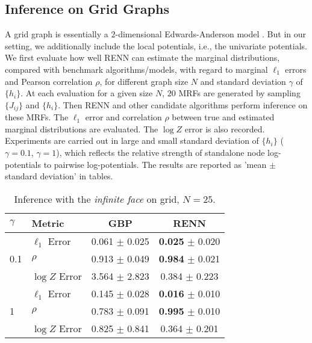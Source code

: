 \subsection{Inference on Grid Graphs}

A grid graph is essentially a $2$-dimensional Edwards-Anderson model \cite{Edwards_1975}. But in our setting, we additionally include the local potentials, i.e., the univariate potentials. We first evaluate how well RENN can estimate the marginal distributions, compared with benchmark algorithms/models, with regard to marginal $\ell_1$ errors and Pearson correlation $\rho$, for different graph size $N$ and standard deviation $\gamma$ of $\{h_i\}$. At each evaluation for a given size $N$, $20$ MRFs are generated by sampling $\{J_{ij}\}$ and $\{h_i\}$. Then RENN and other candidate algorithms perform inference on these MRFs. The $\ell_1$ error and correlation $\rho$ between true and estimated marginal distributions are evaluated. The $\log{Z}$ error is also recorded.
Experiments are carried out in large and small standard deviation of $\{h_i\}$ ($\gamma=0.1$, $\gamma=1$), which reflects the relative strength of standalone node log-potentials to pairwise log-potentials. The results are reported as 'mean $\pm$ standard deviation' in tables.

\begin{table}[tp!]
  \caption{Inference with the \textit{infinite face} on grid, $N=25$.}
  \label{tab:infer-infinite-face}
  \begin{center}
    \begin{small}
      
      \begin{tabular}{llcc}
        \toprule
        $\gamma$ & Metric & GBP & RENN \\
        \midrule
        \multirow{3}{*}{0.1}
                 & $\ell_1$ Error & 0.061 $\pm$ 0.025 & \textbf{0.025} $\pm$ 0.020 \\

                 & $\rho$   & 0.913 $\pm$ 0.049  &  \textbf{0.984} $\pm$ 0.021  \\
                 & $\log{Z}$ Error & 3.564 $\pm$ 2.823  &  0.384 $\pm$ 0.223  \\
        \midrule
        \multirow{3}{*}{1}
                 & $\ell_1$ Error & 0.145 $\pm$ 0.028  & \textbf{0.016} $\pm$ 0.010 \\

                 & $\rho$   & 0.783 $\pm$ 0.091  &  \textbf{0.995} $\pm$ 0.010 \\
                 & $\log{Z}$ Error & 0.825 $\pm$ 0.841  & 0.364 $\pm$ 0.201 \\
        
        \bottomrule
      \end{tabular}

    \end{small}
  \end{center}
\end{table}







